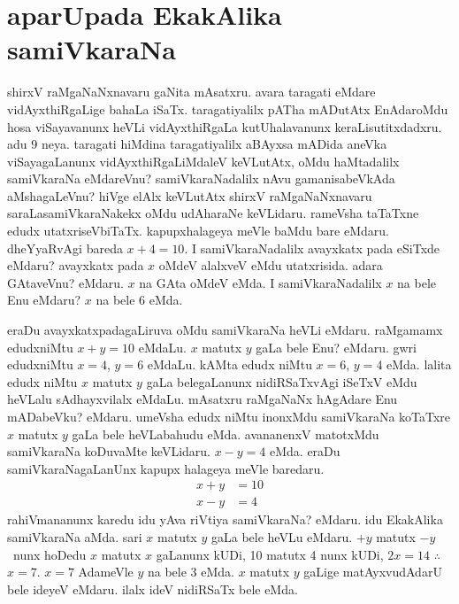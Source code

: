 \chapter{aparUpada EkakAlika samiVkaraNa}
\vskip -20pt

shirxV raMgaNaNxnavaru gaNita mAsatxru. avara taragati eMdare vidAyxthiRgaLige bahaLa iSaTx. taragatiyalilx pATha mADutAtx EnAdaroMdu hosa viSayavanunx heVLi vidAyxthiRgaLa kutUhalavanunx keraLisutitxdadxru. adu {\rm 9} neya. taragati hiMdina taragatiyalilx aBAyxsa mADida aneVka viSayagaLanunx vidAyxthiRgaLiMdaleV keVLutAtx, oMdu haMtadalilx samiVkaraNa eMdareVnu? samiVkaraNadalilx nAvu gamanisabeVkAda aMshagaLeVnu? hiVge elAlx keVLutAtx shirxV raMgaNaNxnavaru saraLasamiVkaraNakekx oMdu udAharaNe keVLidaru. rameVsha taTaTxne edudx utatxriseVbiTaTx. kapupxhalageya meVle baMdu bare eMdaru. dheYyaRvAgi bareda $x+4=10$. I samiVkaraNadalilx avayxkatx pada eSiTxde eMdaru? avayxkatx pada $x$ oMdeV alalxveV eMdu utatxrisida. adara GAtaveVnu? eMdaru. $x$ na GAta oMdeV eMda. I samiVkaraNadalilx $x$ na bele Enu eMdaru? $x$ na bele {\rm 6} eMda.

eraDu avayxkatxpadagaLiruva oMdu samiVkaraNa heVLi eMdaru. raMgamamx edudxniMtu $x+y=10$ eMdaLu. $x$ matutx $y$ gaLa bele Enu? eMdaru. gwri edudxniMtu $x=4$, $y=6$ eMdaLu. kAMta edudx niMtu $x=6$, $y=4$ eMda. lalita edudx niMtu \;$x$\; matutx $y$ gaLa belegaLanunx nidiRSaTxvAgi iSeTxV eMdu heVLalu sAdhayxvilalx eMdaLu. mAsatxru raMgaNaNx hAgAdare Enu mADabeVku? eMdaru. umeVsha edudx niMtu inonxMdu samiVkaraNa koTaTxre $x$ matutx $y$ gaLa bele heVLabahudu eMda. avananenxV matotxMdu samiVkaraNa koDuvaMte keVLidaru. $x-y=4$ eMda. eraDu samiVkaraNagaLanUnx kapupx halageya meVle baredaru.
\begin{align*}
x+y &=10\\
x-y &=4
\end{align*}
rahiVmananunx karedu idu yAva riVtiya samiVkaraNa? eMdaru. idu EkakAlika samiVkaraNa aMda. sari $x$ matutx $y$ gaLa bele heVLu eMdaru. $+y$ matutx $-y$~nunx hoDedu $x$ matutx $x$ gaLanunx kUDi, {\rm 10} matutx {\rm 4} nunx kUDi, $2x=14$\; $\therefore$ $x=7$.  $x=7$  AdameVle $y$ na bele {\rm 3} eMda. $x$ matutx $y$ gaLige matAyxvudAdarU bele ideyeV eMdaru. ilalx ideV nidiRSaTx bele eMda.

